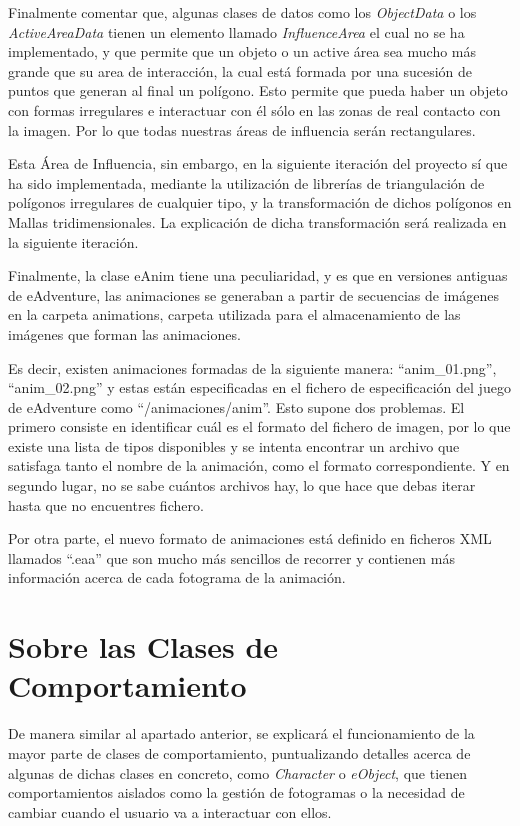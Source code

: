 Finalmente comentar que, algunas clases de datos como los \textit{ObjectData} o los \textit{ActiveAreaData} tienen un elemento llamado \textit{InfluenceArea} el cual no se ha implementado, y que permite que un objeto o un active área sea mucho más grande que su area de interacción, la cual está formada por una sucesión de puntos que generan al final un polígono. Esto permite que pueda haber un objeto con formas irregulares e interactuar con él sólo en las zonas de real contacto con la imagen. Por lo que todas nuestras áreas de influencia serán rectangulares.

Esta Área de Influencia, sin embargo, en la siguiente iteración del proyecto sí que ha sido implementada, mediante la utilización de librerías de triangulación de polígonos irregulares de cualquier tipo, y la transformación de dichos polígonos en Mallas tridimensionales. La explicación de dicha transformación será realizada en la siguiente iteración.

Finalmente, la clase eAnim tiene una peculiaridad, y es que en versiones antiguas de eAdventure, las animaciones se generaban a partir de secuencias de imágenes en la carpeta animations, carpeta utilizada para el almacenamiento de las imágenes que forman las animaciones.

Es decir, existen animaciones formadas de la siguiente manera: “anim\_01.png”, “anim\_02.png” y estas están especificadas en el fichero de especificación del juego de eAdventure como “/animaciones/anim”. Esto supone dos problemas. El primero consiste en identificar cuál es el formato del fichero de imagen, por lo que existe una lista de tipos disponibles y se intenta encontrar un archivo que satisfaga tanto el nombre de la animación, como el formato correspondiente. Y en segundo lugar, no se sabe cuántos archivos hay, lo que hace que debas iterar hasta que no encuentres fichero.

Por otra parte, el nuevo formato de animaciones está definido en ficheros XML llamados “.eaa” que son mucho más sencillos de recorrer y contienen más información acerca de cada fotograma de la animación.

\section{Sobre las Clases de Comportamiento}

De manera similar al apartado anterior, se explicará el funcionamiento de la mayor parte de clases de comportamiento, puntualizando detalles acerca de algunas de dichas clases en concreto, como \textit{Character} o \textit{eObject}, que tienen comportamientos aislados como la gestión de fotogramas o la necesidad de cambiar cuando el usuario va a interactuar con ellos.

